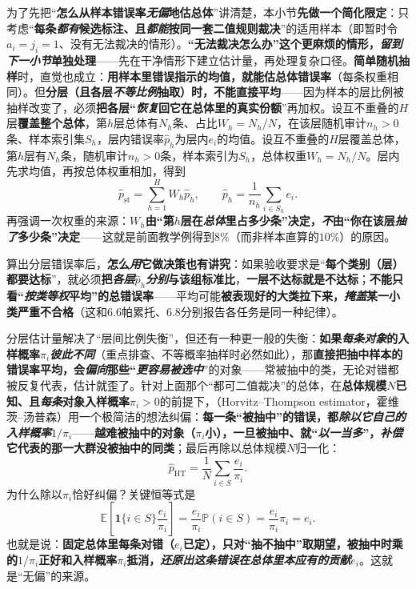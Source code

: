 为了先把“\textbf{怎么从样本错误率\emph{无偏}地估总体}”讲清楚，本小节\textbf{先做一个简化限定}：只考虑“\textbf{每条\emph{都有}候选标注、且\emph{都能}按同一套二值规则裁决}”的适用样本（即暂时令$a_i=j_i=1$、没有无法裁决的情形）。\textbf{“无法裁决怎么办”这个更麻烦的情形，\emph{留到下一小节}单独处理}——先在干净情形下建立估计量，再处理复杂口径。\textbf{简单随机抽样}时，直觉也成立：\textbf{用样本里错误指示的均值，就能估总体错误率}（每条权重相同）。但\textbf{分层（且各层\emph{不等比例}抽取）时，不能直接平均}——因为样本的层比例被抽样改变了，必须\textbf{把各层“\emph{恢复}回它在总体里的真实份额}”再加权。设互不重叠的$H$层\textbf{覆盖整个总体}，第$h$层总体有$N_h$条、占比$W_h=N_h/N$，在该层随机审计$n_h>0$条、样本索引集$S_h$，层内错误率$\widehat p_h$为层内$e_i$的均值。设互不重叠的$H$层覆盖总体，第$h$层有$N_h$条，随机审计$n_h>0$条，样本索引为$S_h$，总体权重$W_h=N_h/N$。层内先求均值，再按总体权重相加，得到
\begin{equation}
  \widehat p_{\mathrm{st}}
  =
  \sum_{h=1}^{H}W_h\widehat p_h,
  \qquad
  \widehat p_h
  =
  \frac{1}{n_h}\sum_{i\in S_h}e_i.
  \label{eq:knowledge-quality-assessment-correction-stratified-rate}
\end{equation}
再强调一次权重的来源：\textbf{$W_h$由“第$h$层在\emph{总体}里占多少条”决定，\emph{不}由“你在该层\emph{抽了}多少条”决定}——这就是前面教学例得到$8\%$（而非样本直算的$10\%$）的原因。

算出分层错误率后，\textbf{怎么\emph{用}它做决策也有讲究}：如果验收要求是“\textbf{每个类别（层）都要达标}”，就必须\textbf{把\emph{各层}$\widehat p_h$\emph{分别}与该组标准比}，\textbf{一层不达标就是不达标}；\textbf{不能只看“\emph{按类等权}平均”的总错误率}——平均可能\textbf{被表现好的大类拉下来，\emph{掩盖}某一小类严重不合格}（这和6.6帕累托、6.8分别报告各任务是同一种纪律）。

分层估计量解决了“层间比例失衡”，但还有一种更一般的失衡：\textbf{如果\emph{每条对象}的入样概率$\pi_i$\emph{彼此不同}}（重点排查、不等概率抽样时必然如此），那\textbf{直接把抽中样本的错误率平均，会\emph{偏向}那些“\emph{更容易被选中}}”的对象——常被抽中的类，无论对错都被反复代表，估计就歪了。针对上面那个“都可二值裁决”的总体，在\textbf{总体规模$N$已知、且\emph{每条}对象入样概率$\pi_i>0$}的前提下，（Horvitz--Thompson estimator，霍维茨–汤普森）用一个极简洁的想法纠偏：\textbf{每一条“被抽中”的错误，都\emph{除以它自己的入样概率}$1/\pi_i$}——\textbf{越难被抽中的对象（$\pi_i$小），一旦被抽中、就“\emph{以一当多}”，\emph{补偿}它代表的那一大群没被抽中的同类}；最后再除以总体规模$N$归一化：
\begin{equation}
  \widehat p_{\mathrm{HT}}
  =
  \frac{1}{N}
  \sum_{i\in S}\frac{e_i}{\pi_i}.
  \label{eq:knowledge-quality-assessment-correction-ht-rate}
\end{equation}
为什么除以$\pi_i$恰好纠偏？关键恒等式是
$$\mathbb{E}\!\left[\mathbf{1}\{i\in S\}\frac{e_i}{\pi_i}\right]=\frac{e_i}{\pi_i}\mathbb{P}(i\in S)=\frac{e_i}{\pi_i}\pi_i=e_i.$$
也就是说：\textbf{固定总体里每条对错（$e_i$已定），只对“抽不抽中”取期望，被抽中时乘的$1/\pi_i$正好和入样概率$\pi_i$抵消，\emph{还原出这条错误在总体里本应有的贡献}$e_i$}。这就是“无偏”的来源。

